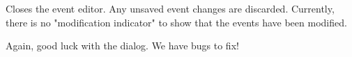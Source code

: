    Closes the event editor.
   Any unsaved event changes are discarded.
   Currently, there is no "modification indicator" to show that the events have
   been modified.

   Again, good luck with the dialog.  We have bugs to fix!

